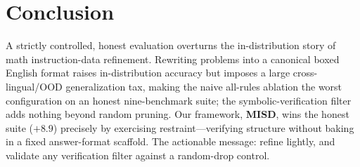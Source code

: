 \documentclass[letterpaper]{article} %
\begin{document}
\section{Conclusion}
A strictly controlled, honest evaluation overturns the in-distribution story of math instruction-data refinement. Rewriting problems into a canonical boxed English format raises in-distribution accuracy but imposes a large cross-lingual/OOD generalization tax, making the naive all-rules ablation the worst configuration on an honest nine-benchmark suite; the symbolic-verification filter adds nothing beyond random pruning. Our framework, \textbf{MISD}, wins the honest suite ($+8.9$) precisely by exercising restraint---verifying structure without baking in a fixed answer-format scaffold. The actionable message: refine lightly, and validate any verification filter against a random-drop control.


\end{document}
